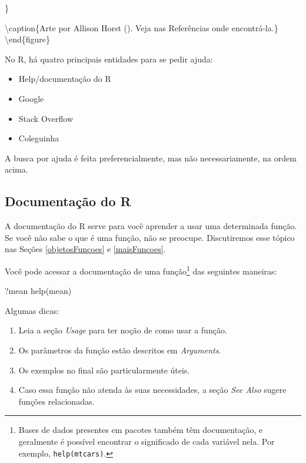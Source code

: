 \documentclass[
]{book}
\newenvironment{Shaded}{\begin{snugshade}}{\end{snugshade}}
\newcommand{\FunctionTok}[1]{\textcolor[rgb]{0.00,0.00,0.00}{#1}}
\newcommand{\NormalTok}[1]{#1}
\providecommand{\tightlist}{%
  \setlength{\itemsep}{0pt}\setlength{\parskip}{0pt}}
\begin{document}
\}

\textbackslash caption\{Arte por Allison Horst (\citet{allison_horst}). Veja nas Referências onde encontrá-la.\}\label{fig:r-base-1}
\textbackslash end\{figure\}

No R, há quatro principais entidades para se pedir ajuda:

\begin{itemize}
\tightlist
\item
  Help/documentação do R
\item
  Google
\item
  Stack Overflow
\item
  Coleguinha
\end{itemize}

A busca por ajuda é feita preferencialmente, mas não necessariamente, na ordem acima.

\hypertarget{documentauxe7uxe3o-do-r}{%
\subsection{Documentação do R}\label{documentauxe7uxe3o-do-r}}

A documentação do R serve para você aprender a usar uma determinada função. Se você não sabe o que é uma função, não se preocupe. Discutiremos esse tópico nas Seções \ref{objetosFuncoes} e \ref{maisFuncoes}.

Você pode acessar a documentação de uma função\footnote{Bases de dados presentes em pacotes também têm documentação, e geralmente é possível encontrar o significado de cada variável nela. Por exemplo, \texttt{help(mtcars)}.} das seguintes maneiras:

\begin{Shaded}
\begin{Highlighting}[]
\NormalTok{?mean}
\FunctionTok{help}\NormalTok{(mean)}
\end{Highlighting}
\end{Shaded}

Algumas dicas:

\begin{enumerate}
\def\labelenumi{\arabic{enumi}.}
\tightlist
\item
  Leia a seção \emph{Usage} para ter noção de como usar a função.
\item
  Os parâmetros da função estão descritos em \emph{Arguments}.
\item
  Os exemplos no final são particularmente úteis.
\item
  Caso essa função não atenda às suas necessidades, a seção \emph{See Also} sugere funções relacionadas.
\end{enumerate}
\end{document}
